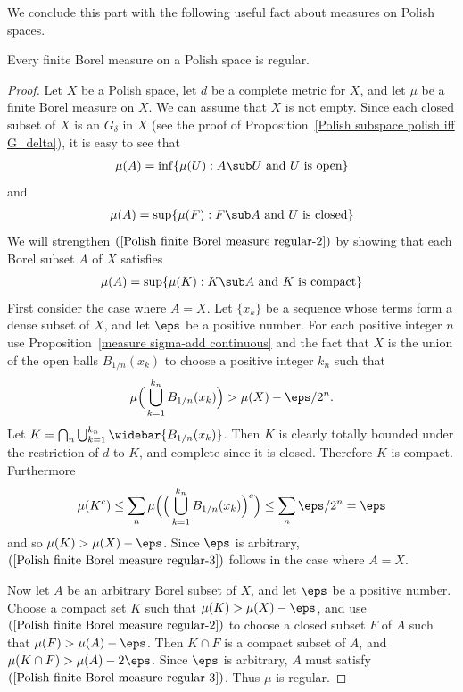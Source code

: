 We conclude this part with the following useful fact about measures on Polish spaces.
\begin{proposition}\label{Polish finite Borel measure regular}
Every finite Borel measure on a Polish space is regular.
\end{proposition}
\begin{proof}
Let $X$ be a Polish space, let $d$ be a complete metric for $X$, and let $\mu$ be a finite Borel measure on $X$. We can assume that $X$ is not empty. Since each closed subset of $X$ is an $G_\delta$ in $X$ (see the proof of Proposition~\ref{Polish subspace polish iff G_delta}), it is easy to see that
\begin{align}\label{Polish finite Borel measure regular-1}
\mu(A)=\inf\{\mu(U):A\sub U\text{ and $U$ is open}\}
\end{align}
and
\begin{align}\label{Polish finite Borel measure regular-2}
\mu(A)=\sup\{\mu(F):F\sub A\text{ and $U$ is closed}\}
\end{align}
We will strengthen $(\ref{Polish finite Borel measure regular-2})$ by showing that each Borel subset $A$ of $X$ satisfies
\begin{align}\label{Polish finite Borel measure regular-3}
\mu(A)=\sup\{\mu(K):K\sub A\text{ and $K$ is compact}\}
\end{align}
First consider the case where $A=X$. Let $\{x_k\}$ be a sequence whose terms form a dense subset of $X$, and let $\eps$ be a positive number. For each positive integer $n$ use Proposition~\ref{measure sigma-add continuous} and the fact that $X$ is the union of the open balls $B_{1/n}(x_k)$ to choose a positive integer $k_n$ such that
\[\mu\Big(\bigcup_{k=1}^{k_n}B_{1/n}(x_k)\Big)>\mu(X)-\eps/2^n.\]
Let $K=\bigcap_n\bigcup_{k=1}^{k_n}\widebar{B_{1/n}(x_k)}$. Then $K$ is clearly totally bounded under the restriction of $d$ to $K$, and complete since it is closed. Therefore $K$ is compact. Furthermore
\[\mu(K^c)\leq\sum_n\mu\Big(\Big(\bigcup_{k=1}^{k_n}B_{1/n}(x_k)\Big)^c\Big)\leq\sum_n\eps/2^n=\eps\]
and so $\mu(K)>\mu(X)-\eps$. Since $\eps$ is arbitrary, $(\ref{Polish finite Borel measure regular-3})$ follows in the case where $A=X$.\par
Now let $A$ be an arbitrary Borel subset of $X$, and let $\eps$ be a positive number. Choose a compact set $K$ such that $\mu(K)>\mu(X)-\eps$, and use $(\ref{Polish finite Borel measure regular-2})$ to choose a closed subset $F$ of $A$ such that $\mu(F)>\mu(A)-\eps$. Then $K\cap F$ is a compact subset of $A$, and $\mu(K\cap F)>\mu(A)-2\eps$. Since $\eps$ is arbitrary, $A$ must satisfy $(\ref{Polish finite Borel measure regular-3})$. Thus $\mu$ is regular.
\end{proof}
